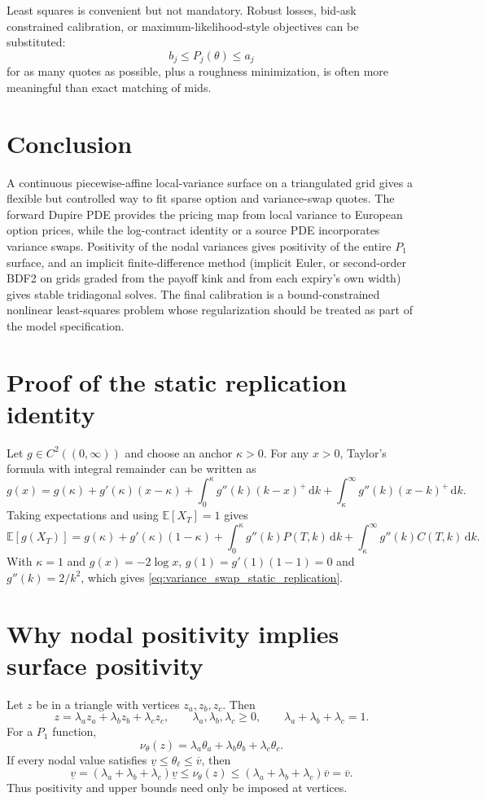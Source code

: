 \documentclass[11pt]{article}
\newcommand{\E}{\mathbb{E}}
\newcommand{\1}{\mathbf{1}}
\newcommand{\dd}{\,\mathrm{d}}
\newcommand{\vloc}{\nu}
\begin{document}
Least squares is convenient but not mandatory. Robust losses, bid-ask constrained
calibration, or maximum-likelihood-style objectives can be substituted:
\[
  b_j\le P_j(\theta)\le a_j
\]
for as many quotes as possible, plus a roughness minimization, is often more meaningful
than exact matching of mids.

\section{Conclusion}

A continuous piecewise-affine local-variance surface on a triangulated grid gives a
flexible but controlled way to fit sparse option and variance-swap quotes. The forward
Dupire PDE provides the pricing map from local variance to European option prices, while
the log-contract identity or a source PDE incorporates variance swaps. Positivity of the
nodal variances gives positivity of the entire $P_1$ surface, and an implicit
finite-difference method (implicit Euler, or second-order BDF2 on grids graded from the
payoff kink and from each expiry's own width) gives stable tridiagonal solves. The final calibration is a
bound-constrained nonlinear least-squares problem whose regularization should be treated
as part of the model specification.

\appendix

\section{Proof of the static replication identity}

Let $g\in C^2((0,\infty))$ and choose an anchor $\kappa>0$. For any $x>0$,
Taylor's formula with integral remainder can be written as
\[
  g(x)
  =
  g(\kappa)+g'(\kappa)(x-\kappa)
  +\int_0^\kappa g''(k)(k-x)^+\dd k
  +\int_\kappa^\infty g''(k)(x-k)^+\dd k.
\]
Taking expectations and using $\E[X_T]=1$ gives
\[
  \E[g(X_T)]
  =
  g(\kappa)+g'(\kappa)(1-\kappa)
  +\int_0^\kappa g''(k)P(T,k)\dd k
  +\int_\kappa^\infty g''(k)C(T,k)\dd k.
\]
With $\kappa=1$ and $g(x)=-2\log x$, $g(1)=g'(1)(1-1)=0$ and
$g''(k)=2/k^2$, which gives \eqref{eq:variance_swap_static_replication}.

\section{Why nodal positivity implies surface positivity}

Let $z$ be in a triangle with vertices $z_a,z_b,z_c$. Then
\[
  z=\lambda_az_a+\lambda_bz_b+\lambda_cz_c,
  \qquad
  \lambda_a,\lambda_b,\lambda_c\ge0,\qquad
  \lambda_a+\lambda_b+\lambda_c=1.
\]
For a $P_1$ function,
\[
  \vloc_\theta(z)=\lambda_a\theta_a+\lambda_b\theta_b+\lambda_c\theta_c.
\]
If every nodal value satisfies $\underline v\le \theta_\ell\le\overline v$, then
\[
  \underline v
  =
  (\lambda_a+\lambda_b+\lambda_c)\underline v
  \le
  \vloc_\theta(z)
  \le
  (\lambda_a+\lambda_b+\lambda_c)\overline v
  =
  \overline v.
\]
Thus positivity and upper bounds need only be imposed at vertices.
\end{document}
